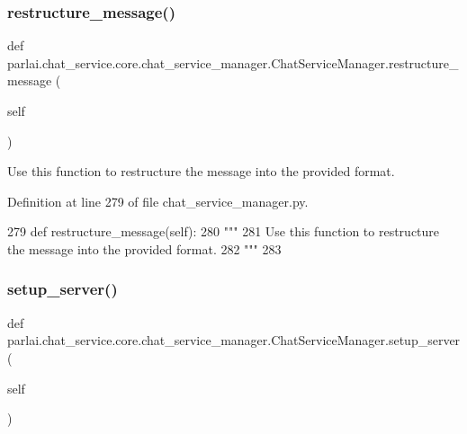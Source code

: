 \subsubsection{\texorpdfstring{restructure\+\_\+message()}{restructure\_message()}}
{\footnotesize\ttfamily def parlai.\+chat\+\_\+service.\+core.\+chat\+\_\+service\+\_\+manager.\+Chat\+Service\+Manager.\+restructure\+\_\+message (\begin{DoxyParamCaption}\item[{}]{self }\end{DoxyParamCaption})}

\begin{DoxyVerb}Use this function to restructure the message into the provided format.
\end{DoxyVerb}
 

Definition at line 279 of file chat\+\_\+service\+\_\+manager.\+py.


\begin{DoxyCode}
279     \textcolor{keyword}{def }restructure\_message(self):
280         \textcolor{stringliteral}{"""}
281 \textcolor{stringliteral}{        Use this function to restructure the message into the provided format.}
282 \textcolor{stringliteral}{        """}
283 
\end{DoxyCode}
\mbox{\label{classparlai_1_1chat__service_1_1core_1_1chat__service__manager_1_1ChatServiceManager_a147d73ca0427e9571a3c462d75412536}} 
\subsubsection{\texorpdfstring{setup\+\_\+server()}{setup\_server()}}
{\footnotesize\ttfamily def parlai.\+chat\+\_\+service.\+core.\+chat\+\_\+service\+\_\+manager.\+Chat\+Service\+Manager.\+setup\+\_\+server (\begin{DoxyParamCaption}\item[{}]{self }\end{DoxyParamCaption})}

